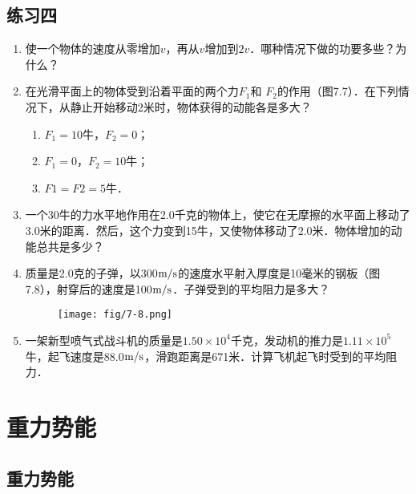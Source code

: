     \subsection*{练习四}
    \begin{enumerate}
        \item 使一个物体的速度从零增加$v$，再从$v$增加到$2v$．哪种情况下做的功要多些？为什么？
        \item 在光滑平面上的物体受到沿着平面的两个力$F_1$和
        $F_2$的作用（图7.7）．在下列情况下，从静止开始移动2米时，物体获得的动能各是多大？
        \begin{enumerate}
            \item $F_1=10$牛，$F_2=0$；
            \item $F_1=0$，$F_2=10$牛；
            \item $F1=F2=5$牛．
        \end{enumerate}
\begin{figure}[htp]\centering
{}
\caption{}
\end{figure}

    \item 一个30牛的力水平地作用在2.0千克的物体上，使它在无摩擦的水平面上移动了3.0米的距离．然后，这个力变到15牛，又使物体移动了2.0米．物体增加的动能总共是多少？
\item 质量是2.0克的子弹，以300$\text{m}/\text{s}$的速度水平射入厚度是10毫米的钢板（图7.8），射穿后的速度是100$\text{m}/\text{s}$．子弹受到的平均阻力是多大？
\begin{figure}[htp]
\centering\texttt{[image: fig/7-8.png]}
\caption{}
\end{figure}
\item 一架新型喷气式战斗机的质量是$1.50\times 10^4$千克，发动机的推力是$1.11\times 10^5$牛，起飞速度是88.0$\text{m}/\text{s}$，滑跑距离是671米．计算飞机起飞时受到的平均阻力．
    \end{enumerate}

   \section{重力势能}

   \subsection{重力势能}
   
